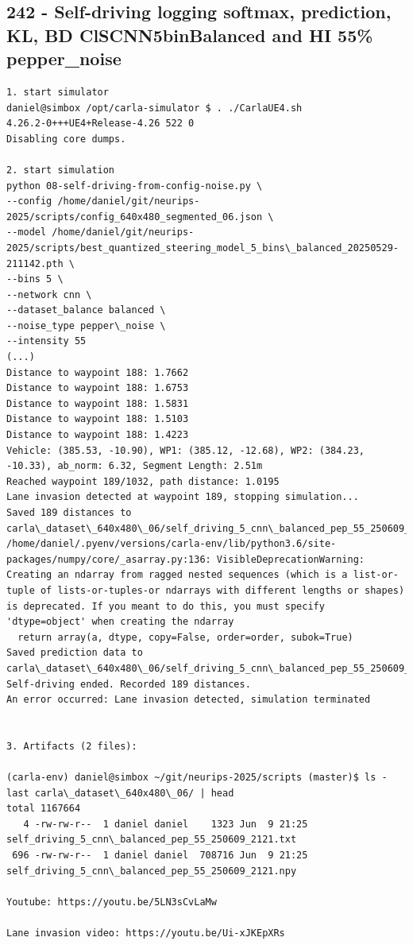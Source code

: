 \subsection{242 - Self-driving logging softmax, prediction, KL, BD ClSCNN5binBalanced and HI 55\% pepper\_noise}
\label{app_res:242}

\begin{verbatim}
1. start simulator
daniel@simbox /opt/carla-simulator $ . ./CarlaUE4.sh 
4.26.2-0+++UE4+Release-4.26 522 0
Disabling core dumps.

2. start simulation
python 08-self-driving-from-config-noise.py \
--config /home/daniel/git/neurips-2025/scripts/config_640x480_segmented_06.json \
--model /home/daniel/git/neurips-2025/scripts/best_quantized_steering_model_5_bins\_balanced_20250529-211142.pth \
--bins 5 \
--network cnn \
--dataset_balance balanced \
--noise_type pepper\_noise \
--intensity 55   
(...)
Distance to waypoint 188: 1.7662
Distance to waypoint 188: 1.6753
Distance to waypoint 188: 1.5831
Distance to waypoint 188: 1.5103
Distance to waypoint 188: 1.4223
Vehicle: (385.53, -10.90), WP1: (385.12, -12.68), WP2: (384.23, -10.33), ab_norm: 6.32, Segment Length: 2.51m
Reached waypoint 189/1032, path distance: 1.0195
Lane invasion detected at waypoint 189, stopping simulation...
Saved 189 distances to carla\_dataset\_640x480\_06/self_driving_5_cnn\_balanced_pep_55_250609_2121.txt
/home/daniel/.pyenv/versions/carla-env/lib/python3.6/site-packages/numpy/core/_asarray.py:136: VisibleDeprecationWarning: Creating an ndarray from ragged nested sequences (which is a list-or-tuple of lists-or-tuples-or ndarrays with different lengths or shapes) is deprecated. If you meant to do this, you must specify 'dtype=object' when creating the ndarray
  return array(a, dtype, copy=False, order=order, subok=True)
Saved prediction data to carla\_dataset\_640x480\_06/self_driving_5_cnn\_balanced_pep_55_250609_2121.npy
Self-driving ended. Recorded 189 distances.
An error occurred: Lane invasion detected, simulation terminated


3. Artifacts (2 files):

(carla-env) daniel@simbox ~/git/neurips-2025/scripts (master)$ ls -last carla\_dataset\_640x480\_06/ | head
total 1167664
   4 -rw-rw-r--  1 daniel daniel    1323 Jun  9 21:25 self_driving_5_cnn\_balanced_pep_55_250609_2121.txt
 696 -rw-rw-r--  1 daniel daniel  708716 Jun  9 21:25 self_driving_5_cnn\_balanced_pep_55_250609_2121.npy

Youtube: https://youtu.be/5LN3sCvLaMw

Lane invasion video: https://youtu.be/Ui-xJKEpXRs

\end{verbatim}

